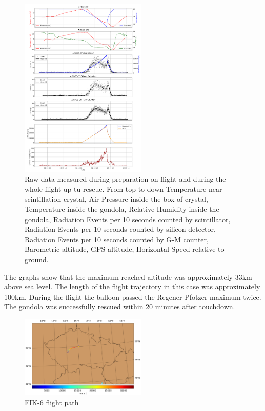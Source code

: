 \documentclass{Rpd}
\begin{document}
\begin{center}
\begin{figure}%
	\centerline{\includegraphics[width=60mm]{img/FIK-6_RAW_data.png}}
	\caption{Raw data measured during preparation on flight and during the whole flight up tu rescue. From top to down Temperature near scintillation crystal, Air Pressure inside the box of crystal, Temperature inside the gondola, Relative Humidity inside the gondola, Radiation Events per 10 seconds counted by scintillator, Radiation Events per 10 seconds counted by silicon detector, Radiation Events per 10 seconds counted by G-M counter, Barometric altitude, GPS altitude, Horizontal Speed relative to ground. \label{FIK-6_RAW_data}}
\end{figure}
\end{center}


The graphs show that the maximum reached altitude was approximately 33km above sea level. The length of the flight trajectory in this case was approximately 100km. During the flight the balloon passed the Regener-Pfotzer maximum twice. The gondola was successfully rescued within 20 minutes after touchdown.


\begin{center}
\begin{figure}%
	\centerline{\includegraphics[width=60mm]{img/FIK-6_flight_path.png}}
	\caption{FIK-6 flight path \label{FIK-6_flight_path}}
\end{figure}
\end{center}
\end{document}
